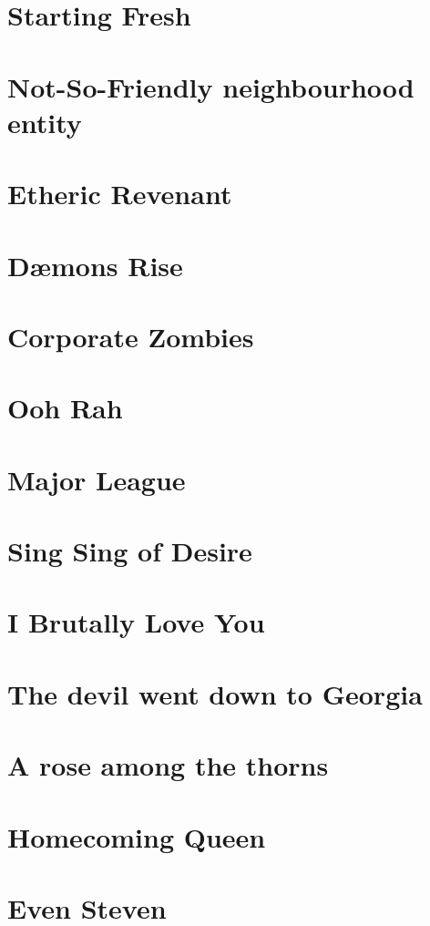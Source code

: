 \documentclass[12pt,twoside,onecolumn,openright,extrafontsizes]{memoir}
\begin{document}
	\chapter{Starting Fresh}
	
	\chapter{Not-So-Friendly neighbourhood entity}
	
	\chapter{Etheric Revenant}
	
	\chapter{D\ae mons Rise}
	
	\chapter{Corporate Zombies}
	
	\chapter{Ooh Rah}
	
	\chapter{Major League}
	
	\chapter{Sing Sing of Desire}
	
	\chapter{I Brutally Love You}
	
	\chapter{The devil went down to Georgia}
	
	\chapter{A rose among the thorns}
	
	\chapter{Homecoming Queen}
	
	\chapter{Even Steven}
	
\end{document}
